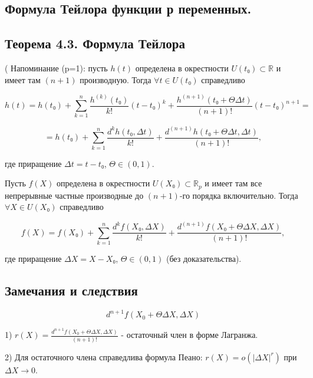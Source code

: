 {
\subsection{Формула Тейлора функции р переменных.}

\subsection*{Теорема 4.3. Формула Тейлора}

( Напоминание (p=1): пусть \( h(t) \) определена в окрестности \( U(t₀) \subset \mathbb{R} \) и имеет там \( (n+1) \) производную. Тогда \( \forall t \in U(t₀) \) справедливо  



\[
h(t) = h(t₀) + \sum_{k=1}^{n} \frac{h^{(k)}(t₀)}{k!} (t - t₀)^k + \frac{h^{(n+1)}(t₀ + \Theta \Delta t)}{(n+1)!} (t - t₀)^{n+1} =
\]





\[
= h(t₀) + \sum_{k=1}^{n} \frac{d^k h(t₀, \Delta t)}{k!} + \frac{d^{(n+1)} h(t₀ + \Theta \Delta t, \Delta t)}{(n+1)!},
\]



где приращение \( \Delta t = t - t₀ \), \( \Theta \in (0,1) \).  

Пусть \( f(X) \) определена в окрестности \( U(X₀) \subset \mathbb{R}_p \) и имеет там все непрерывные частные производные до \( (n+1) \)-го порядка включительно. Тогда \( \forall X \in U(X₀) \) справедливо  



\[
f(X) = f(X₀) + \sum_{k=1}^{n} \frac{d^k f(X₀, \Delta X)}{k!} + \frac{d^{(n+1)} f(X₀ + \Theta \Delta X, \Delta X)}{(n+1)!},
\]



где приращение \( \Delta X = X - X₀ \), \( \Theta \in (0,1) \) (без доказательства).

\subsection*{Замечания и следствия}



\[
d^{n+1} f \left( X_0 + \Theta \Delta X, \Delta X \right)
\]



1) \( r(X) = \frac{d^{n+1} f \left( X_0 + \Theta \Delta X, \Delta X \right)}{(n+1)!} \) - остаточный член в форме Лагранжа.

2) Для остаточного члена справедлива формула Пеано: \( r(X) = o(|\Delta X|^r) \) при \( \Delta X \rightarrow 0 \).

}
